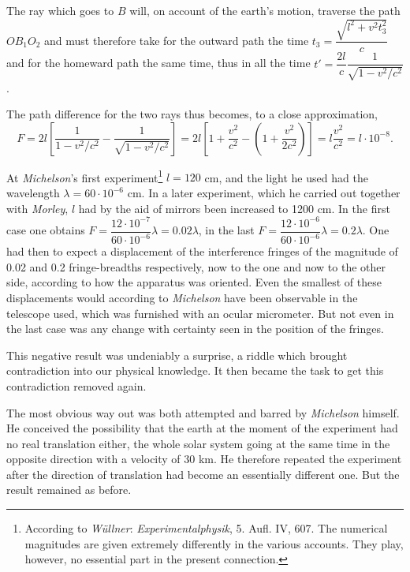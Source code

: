 \documentclass[12pt,a4paper]{article}
\begin{document}
The ray which goes to $B$ will, on account of the earth's motion, traverse the
path $OB_{1}O_{2}$ and must therefore take for the outward path the time
$t_{3} = \dfrac{\sqrt{l^{2}+v^{2}t_{3}^{2}}}{c}$ and for the homeward path the
same time, thus in all the time
$t' = \dfrac{2l}{c}\dfrac{1}{\sqrt{1-v^{2}/c^{2}}}$.

The path difference for the two rays thus becomes, to a close approximation,
\[
  F = 2l\left[\frac{1}{1-v^{2}/c^{2}} - \frac{1}{\sqrt{1-v^{2}/c^{2}}}\right]
    = 2l\left[1+\frac{v^{2}}{c^{2}}
      - \left(1+\frac{v^{2}}{2c^{2}}\right)\right]
    = l\frac{v^{2}}{c^{2}} = l\cdot 10^{-8}.
\]

At \emph{Michelson}'s first experiment\footnote{According to \emph{Wüllner}:
\emph{Experimentalphysik}, 5. Aufl. IV, 607. The numerical magnitudes are
given extremely differently in the various accounts. They play, however, no
essential part in the present connection.} $l = 120$ cm, and the light he
used had the wavelength $\lambda = 60\cdot 10^{-6}$ cm. In a later experiment,
which he carried out together with \emph{Morley}, $l$ had by the aid of
mirrors been increased to 1200 cm. In the first case one obtains
$F = \dfrac{12\cdot 10^{-7}}{60\cdot 10^{-6}}\lambda = 0{.}02\lambda$, in the
last $F = \dfrac{12\cdot 10^{-6}}{60\cdot 10^{-6}}\lambda = 0{.}2\lambda$. One
had then to expect a displacement of the interference fringes of the magnitude
of 0.02 and 0.2 fringe-breadths respectively, now to the one and now to the
other side, according to how the apparatus was oriented. Even the smallest of
these displacements would according to \emph{Michelson} have been observable
in the telescope used, which was furnished with an ocular micrometer. But not
even in the last case was any change with certainty seen in the position of
the fringes.

This negative result was undeniably a surprise, a riddle which brought
contradiction into our physical knowledge. It then became the task to get this
contradiction removed again.

The most obvious way out was both attempted and barred by \emph{Michelson}
himself. He conceived the possibility that the earth at the moment of the
experiment had no real translation either, the whole solar system going at the
same time in the opposite direction with a velocity of 30 km. He therefore
repeated the experiment after the direction of translation had become an
essentially different one. But the result remained as before.
\end{document}
